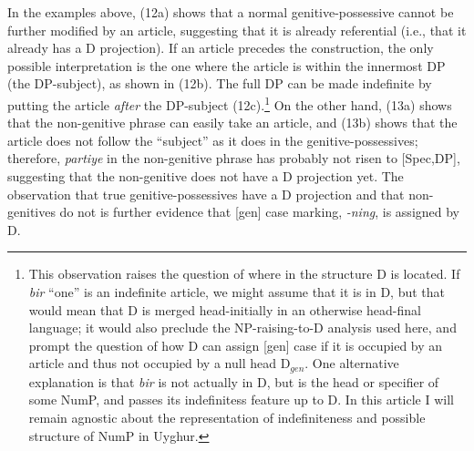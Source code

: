 \documentclass[letterpaper,12pt]{article}
\begin{document}
In the examples above, (12a) shows that a normal genitive-possessive cannot be further modified by an article, suggesting that it is already referential (i.e.,
that it already has a D projection). If an article precedes the construction, the only possible interpretation is the one where the article
is within the innermost DP (the DP-subject), as shown in (12b). The full DP can be made indefinite by putting the article \emph{after} the DP-subject (12c).\footnote{This
observation raises the question of where in the structure D is located. If \textsl{bir} ``one'' is an indefinite article, we might assume that it is in D, but that would mean that D is merged head-initially in an otherwise head-final language; it would also preclude the NP-raising-to-D analysis used here, and prompt the question of how D can assign [gen] case if it is occupied by an article and thus not occupied
by a null head D$_{gen}$. One alternative explanation is that \textsl{bir} is not actually in D, but is the head or specifier of some NumP, and passes its indefinitess feature up to D. In this article I will remain agnostic about the representation of indefiniteness and possible structure of NumP in Uyghur.} On the other hand, (13a) shows that the non-genitive phrase can easily take an article,
and (13b) shows that the article does not follow the ``subject'' as it does in the genitive-possessives; therefore, \textsl{partiye} in the non-genitive phrase has probably not risen to [Spec,DP], suggesting that the non-genitive does not have
a D projection yet. The observation that true genitive-possessives have a D projection and that non-genitives do not is further evidence that [gen] case marking,
\textsl{-ning}, is assigned by D.
\end{document}
